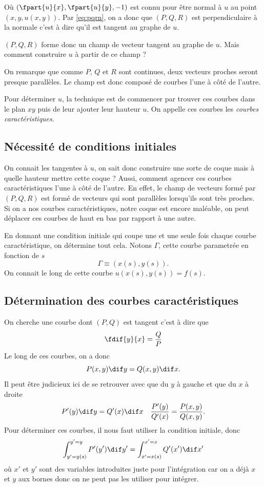 Où $\left(\fpart{u}{x}, \fpart{u}{y}, -1\right)$ est connu pour être normal
à $u$ au point $\left(x, y, u(x, y)\right)$.
Par \eqref{eq:pqrn}, on a donc que $(P, Q, R)$ est perpendiculaire à la normale
c'est à dire qu'il est tangent au graphe de $u$.

$(P, Q, R)$ forme donc un champ de vecteur tangent au graphe de $u$.
Mais comment construire $u$ à partir de ce champ ?

On remarque que comme $P$, $Q$ et $R$ sont continues, deux vecteurs proches
seront presque parallèles. Le champ est donc composé de courbes l'une à côté
de l'autre.

Pour déterminer $u$, la technique est de commencer par trouver ces courbes
dans le plan $xy$ puis de leur ajouter leur hauteur $u$.
On appelle ces courbes les \emph{courbes caractéristiques}.

\subsection{Nécessité de conditions initiales}
On connait les tangentes à $u$, on sait donc construire une
sorte de coque mais à quelle hauteur mettre cette coque ?
Aussi, comment agencer ces courbes caractéristiques l'une à côté de l'autre.
En effet, le champ de vecteurs formé par $(P, Q, R)$ est formé de vecteurs
qui sont parallèles lorsqu'ils sont très proches.
Si on a nos courbes caractéristiques, notre coque est encore maléable,
on peut déplacer ces courbes de haut en bas par rapport à une autre.

En donnant une condition initiale qui coupe une et une seule fois chaque
courbe caractéristique, on détermine tout cela.
Notons $\Gamma$, cette courbe parametrée en fonction de $s$
\[ \Gamma \equiv (x(s), y(s)). \]
On connait le long de cette courbe $u(x(s), y(s)) = f(s)$.

\subsection{Détermination des courbes caractéristiques}
\label{sec:detcara}
On cherche une courbe dont $(P, Q)$ est tangent c'est à dire que
\[ \fdif{y}{x} = \frac{Q}{P} \]
Le long de ces courbes, on a donc
\[ P(x, y)\dif y = Q(x, y) \dif x. \]
Il peut être judicieux ici de se retrouver avec que du $y$ à gauche
et que du $x$ à droite
\begin{align*}
  P'(y) \dif y & = Q'(x) \dif x & \frac{P'(y)}{Q'(x)} = \frac{P(x,y)}{Q(x,y)}.
\end{align*}
Pour déterminer ces courbes, il nous faut utiliser la condition initiale, donc
\[ \int_{y' = y(s)}^{y' = y} P'(y') \dif y'
= \int_{x' = x(s)}^{x' = x} Q'(x') \dif x' \]
où $x'$ et $y'$ sont des variables introduites juste pour l'intégration
car on a déjà $x$ et $y$ aux bornes donc on ne peut pas les utiliser pour
intégrer.

